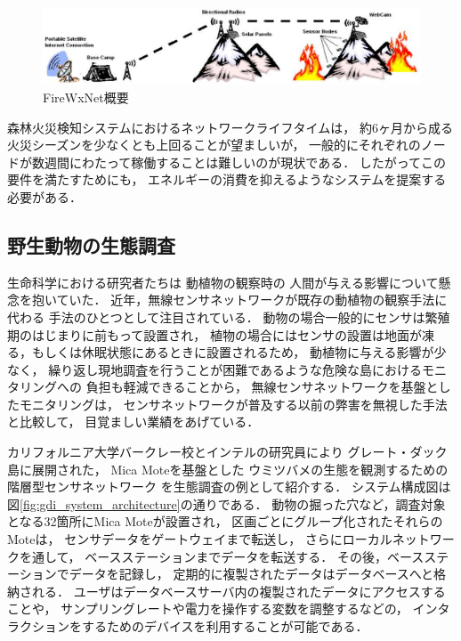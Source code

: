 \begin{figure}[htbp]
 \begin{center}
  \includegraphics[width=140mm]{./images/firewxnet_overview.eps}
 \end{center}
 \caption{FireWxNet概要}
 \label{fig:firewxnet_overview}
\end{figure}


森林火災検知システムにおけるネットワークライフタイムは，
約6ヶ月から成る火災シーズンを少なくとも上回ることが望ましいが，
一般的にそれぞれのノードが数週間にわたって稼働することは難しいのが現状である．
したがってこの要件を満たすためにも，
エネルギーの消費を抑えるようなシステムを提案する必要がある．




\subsection{野生動物の生態調査}
生命科学における研究者たちは
動植物の観察時の
人間が与える影響について懸念を抱いていた．
近年，無線センサネットワークが既存の動植物の観察手法に代わる
手法のひとつとして注目されている．
動物の場合一般的にセンサは繁殖期のはじまりに前もって設置され，
植物の場合にはセンサの設置は地面が凍る，もしくは休眠状態にあるときに設置されるため，
動植物に与える影響が少なく，
繰り返し現地調査を行うことが困難であるような危険な島におけるモニタリングへの
負担も軽減できることから，
無線センサネットワークを基盤としたモニタリングは，
センサネットワークが普及する以前の弊害を無視した手法と比較して，
目覚ましい業績をあげている．

カリフォルニア大学バークレー校とインテルの研究員により
グレート・ダック島に展開された，
Mica Moteを基盤とした
ウミツバメの生態を観測するための
階層型センサネットワーク
\cite{Mainwaring:2002:WSN:570738.570751}
を生態調査の例として紹介する．
システム構成図は図\ref{fig:gdi_system_architecture}の通りである．
動物の掘った穴など，調査対象となる32箇所にMica Moteが設置され，
区画ごとにグループ化されたそれらのMoteは，
センサデータをゲートウェイまで転送し，
さらにローカルネットワークを通して，
ベースステーションまでデータを転送する．
その後，ベースステーションでデータを記録し，
定期的に複製されたデータはデータベースへと格納される．
ユーザはデータベースサーバ内の複製されたデータにアクセスすることや，
サンプリングレートや電力を操作する変数を調整するなどの，
インタラクションをするためのデバイスを利用することが可能である．

